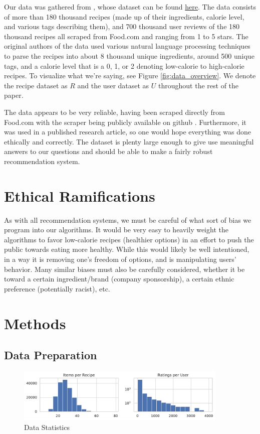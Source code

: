 \documentclass[11pt]{article}
\begin{document}
Our data was gathered from \cite{data}, whose dataset can be found \href{https://www.kaggle.com/shuyangli94/food-com-recipes-and-user-interactions}{here}. The data consists of more than 180 thousand recipes (made up of their ingredients, calorie level, and various tags describing them), and 700 thousand user reviews of the 180 thousand recipes all scraped from Food.com  and ranging from 1 to 5 stars. The original authors of the data used various natural language processing techniques to parse the recipes into about 8 thousand unique ingredients, around 500 unique tags, and a calorie level that is a 0, 1, or 2 denoting low-calorie to high-calorie recipes. To visualize what we're saying, see Figure \ref{fig:data_overview}. We denote the recipe dataset as $R$ and the user dataset as $U$ throughout the rest of the paper.

The data appears to be very reliable, having been scraped directly from Food.com with the scraper being publicly available on github \cite{data_scraper}. Furthermore, it was used in a published research article, so one would hope everything was done ethically and correctly. The dataset is plenty large enough to give use meaningful answers to our questions and should be able to make a fairly robust recommendation system.


\section{Ethical Ramifications}
As with all recommendation systems, we must be careful of what sort of bias we program into our algorithms. It would be very easy to heavily weight the algorithms to favor low-calorie recipes (healthier options) in an effort to push the public towards eating more healthy. While this would likely be well intentioned, in a way it is removing one's freedom of options, and is manipulating users' behavior. Many similar biases must also be carefully considered, whether it be toward a certain ingredient/brand (company sponsorship), a certain ethnic preference (potentially racist), etc.

\section{Methods}

\subsection{Data Preparation}
\begin{figure}[t]
\centering
\includegraphics[width=0.9\textwidth]{figs/dist.pdf}
\caption{Data Statistics}
\label{fig:dist}
\end{figure}
\end{document}
